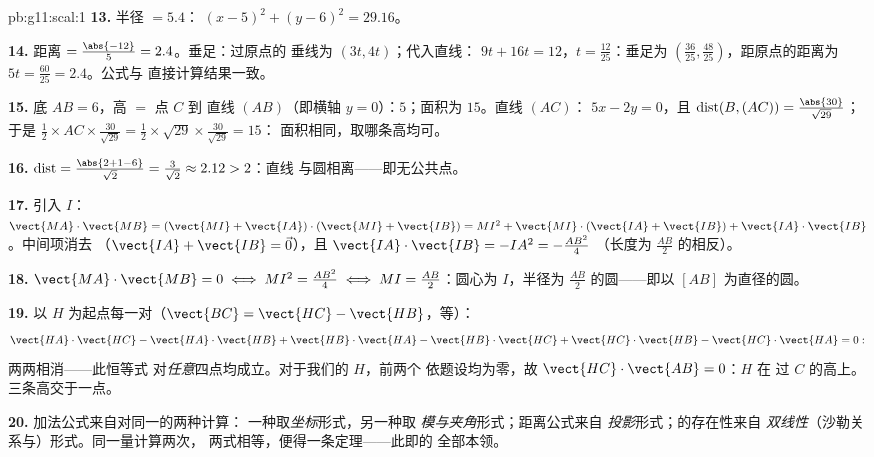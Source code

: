 \begin{solution}{pb:g11:scal:1}
\textbf{13.} 半径 $= 5.4$：
$(x - 5)^2 + (y - 6)^2 = 29.16$。

\textbf{14.} 距离 $= \frac{\abs{-12}}{5} = 2.4$。垂足：过原点的
垂线为 $(3t, 4t)$；代入直线：
$9t + 16t = 12$，$t = \frac{12}{25}$：垂足为
$\left(\frac{36}{25}, \frac{48}{25}\right)$，距原点的距离为
$5t = \frac{60}{25} = 2.4$。公式与
直接计算结果一致。

\textbf{15.} 底 $AB = 6$，高 $=$ 点 $C$ 到
直线 $(AB)$（即横轴 $y = 0$）：$5$；面积为 $15$。直线 $(AC)$：
$5x - 2y = 0$，且
$\operatorname{dist}(B, (AC)) = \frac{\abs{30}}{\sqrt{29}}$；
于是 $\frac12 \times AC \times \frac{30}{\sqrt{29}} =
\frac12 \times \sqrt{29} \times \frac{30}{\sqrt{29}} = 15$：
面积相同，取哪条高均可。

\textbf{16.} $\operatorname{dist} = \frac{\abs{2 + 1 - 6}}
{\sqrt2} = \frac{3}{\sqrt2} \approx 2.12 > 2$：直线
与圆相离——即无公共点。

\textbf{17.} 引入 $I$：
$\vect{MA} \cdot \vect{MB} = (\vect{MI} + \vect{IA}) \cdot
(\vect{MI} + \vect{IB}) = MI^2 + \vect{MI} \cdot (\vect{IA} +
\vect{IB}) + \vect{IA} \cdot \vect{IB}$。中间项消去
（$\vect{IA} + \vect{IB} = \vec 0$），且
$\vect{IA} \cdot \vect{IB} = -IA^2 = -\frac{AB^2}{4}$
（长度为 $\frac{AB}2$ 的相反）。

\textbf{18.} $\vect{MA} \cdot \vect{MB} = 0 \iff MI^2 =
\frac{AB^2}{4} \iff MI = \frac{AB}{2}$：圆心为
$I$，半径为 $\frac{AB}2$ 的圆——即以
$[AB]$ 为直径的圆。

\textbf{19.} 以 $H$ 为起点每一对（$\vect{BC} =
\vect{HC} - \vect{HB}$，等）：
\[
\vect{HA} \cdot \vect{HC} - \vect{HA} \cdot \vect{HB}
+ \vect{HB} \cdot \vect{HA} - \vect{HB} \cdot \vect{HC}
+ \vect{HC} \cdot \vect{HB} - \vect{HC} \cdot \vect{HA} = 0 :
\]
两两相消——此恒等式
对\emph{任意}四点均成立。对于我们的 $H$，前两个
依题设均为零，故
$\vect{HC} \cdot \vect{AB} = 0$：$H$ 在
过 $C$ 的高上。三条高交于一点。

\textbf{20.} 加法公式来自对同一的两种计算：
一种取\emph{坐标}形式，另一种取
\emph{模与夹角}形式；距离公式来自
\emph{投影}形式；的存在性来自
\emph{双线性}（沙勒关系与）形式。同一量计算两次，
两式相等，便得一条定理——此即的
全部本领。
\end{solution}
